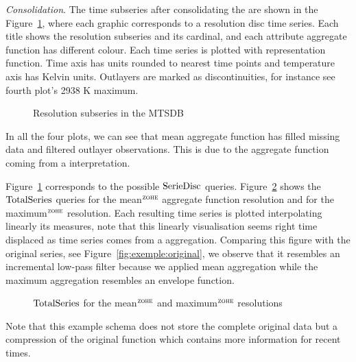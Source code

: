 \emph{Consolidation}. The time subseries after consolidating the
 are shown in the Figure~\ref{fig:exemple:4mrd}, where
each graphic corresponds to a resolution disc time series. Each title
shows the resolution subseries and its cardinal, and each attribute
aggregate function has different colour.  Each time series is plotted
with \zohe{} representation function. Time axis has  units
rounded to nearest time points and temperature axis has Kelvin
units. Outlayers are marked as discontinuities, for instance see
fourth plot's 2938 K maximum.

\begin{figure}[tp]
  \centering
  
  \caption{Resolution subseries in the MTSDB}
  \label{fig:exemple:4mrd}
\end{figure}

In all the four plots, we can see that mean aggregate function has
filled missing data and filtered outlayer observations. This is due
to the aggregate function coming from a \zohe{} interpretation.


Figure~\ref{fig:exemple:4mrd} corresponds to the possible $\operatorname{SerieDisc}$
queries. Figure~\ref{fig:exemple:4mrdtot} shows the $\operatorname{TotalSeries}$
queries for the mean$^{\zohe}$ aggregate function resolution and for
the maximum$^{\zohe}$ resolution.  Each resulting time series is
plotted interpolating linearly its measures, note that this linearly
visualisation seems right time displaced as time series comes from a
\zohe{} aggregation.  Comparing this figure with the original series,
see Figure~\ref{fig:exemple:original}, we observe that it resembles an
incremental low-pass filter because we applied mean aggregation while
the maximum aggregation resembles an envelope function.

\begin{figure}[tp]
  \centering
  \caption{$\operatorname{TotalSeries}$ for the mean$^{\zohe}$ and maximum$^{\zohe}$
    resolutions}
  \label{fig:exemple:4mrdtot}
\end{figure}


Note that this  example schema does not store the complete
original data but a compression of the original function which
contains more information for recent times.









